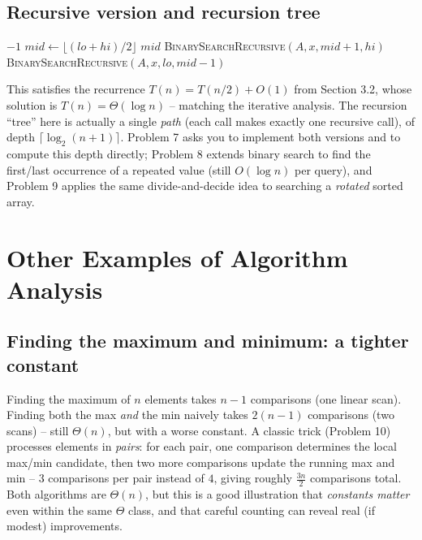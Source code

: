 \documentclass[11pt]{article}
\begin{document}
\subsection{Recursive version and recursion tree}

\begin{algorithm}[h]
\caption{\textsc{BinarySearchRecursive}$(A, x, lo, hi)$}
\begin{algorithmic}[1]
    \State \Return $-1$
\EndIf
\State $mid \gets \lfloor (lo+hi)/2 \rfloor$
    \State \Return $mid$
    \State \Return \textsc{BinarySearchRecursive}$(A, x, mid+1, hi)$
\Else
    \State \Return \textsc{BinarySearchRecursive}$(A, x, lo, mid-1)$
\EndIf
\end{algorithmic}
\end{algorithm}

This satisfies the recurrence $T(n) = T(n/2) + O(1)$ from Section 3.2, whose solution is
$T(n) = \Theta(\log n)$ -- matching the iterative analysis. The recursion ``tree'' here is
actually a single \emph{path} (each call makes exactly one recursive call), of depth
$\lceil \log_2(n+1) \rceil$. Problem 7 asks you to implement both versions and to compute
this depth directly; Problem 8 extends binary search to find the first/last occurrence of a
repeated value (still $O(\log n)$ per query), and Problem 9 applies the same
divide-and-decide idea to searching a \emph{rotated} sorted array.

\section{Other Examples of Algorithm Analysis}

\subsection{Finding the maximum and minimum: a tighter constant}

Finding the maximum of $n$ elements takes $n-1$ comparisons (one linear scan). Finding both
the max \emph{and} the min naively takes $2(n-1)$ comparisons (two scans) -- still
$\Theta(n)$, but with a worse constant. A classic trick (Problem 10) processes elements in
\emph{pairs}: for each pair, one comparison determines the local max/min candidate, then
two more comparisons update the running max and min -- $3$ comparisons per pair instead of
$4$, giving roughly $\frac{3n}{2}$ comparisons total. Both algorithms are $\Theta(n)$, but
this is a good illustration that \emph{constants matter} even within the same $\Theta$
class, and that careful counting can reveal real (if modest) improvements.
\end{document}
